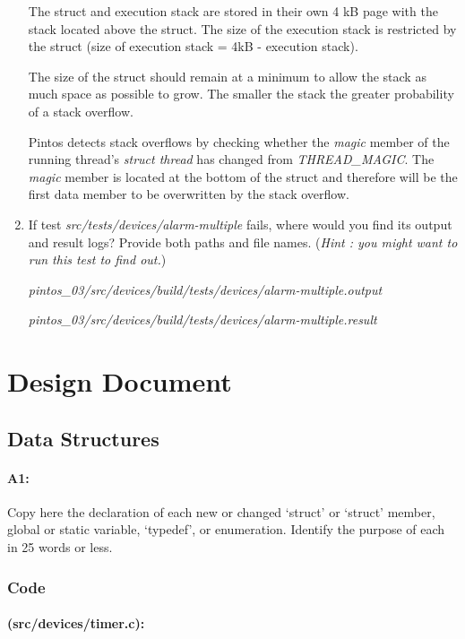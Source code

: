 \documentclass[11pt]{article}
\begin{document}
\begin{enumerate}
The struct and execution stack are stored in their own 4 kB page with the
stack located above the struct. The size of the execution stack is restricted by
the struct (size of execution stack = 4kB - execution stack).

The size of the struct should remain at a minimum to allow the stack as
much space as possible to grow. The smaller the stack the greater probability of
a stack overflow.

Pintos detects stack overflows by checking whether the \emph{magic} member of
the running thread's \emph{struct thread} has changed from
\emph{THREAD\_MAGIC}. The \emph{magic} member is located at the bottom of the
struct and therefore will be the first data member to be overwritten by the
stack overflow.

\item If test \emph{src/tests/devices/alarm-multiple} fails, where would you
find its output and result logs? Provide both paths and file names.
(\emph{Hint : you might want to run this test to find out.})

\emph{pintos\_03/src/devices/build/tests/devices/alarm-multiple.output}

\emph{pintos\_03/src/devices/build/tests/devices/alarm-multiple.result}

\end{enumerate}

\section{Design Document}

\subsection{Data Structures}
\paragraph{A1:}
Copy here the declaration of each new or changed ‘struct’ or ‘struct’ member,
global or static variable, ‘typedef’, or enumeration. Identify the purpose of
each in 25 words or less.
\subsubsection{Code}

\paragraph{(src/devices/timer.c):}
\end{document}
